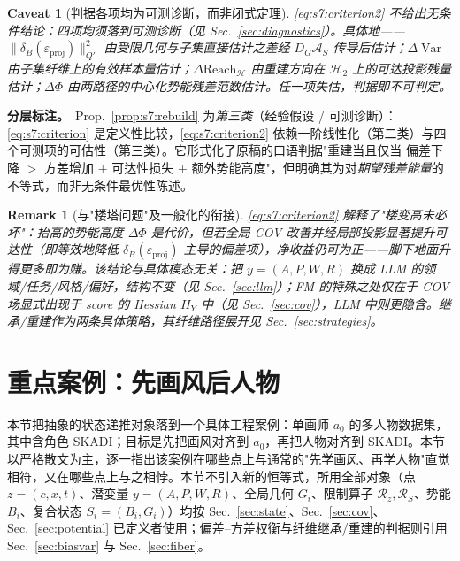 \documentclass[11pt,a4paper]{article}
\newtheorem{remark}[theorem]{Remark}
\newtheorem{caveat}[theorem]{Caveat}
\DeclareMathOperator{\Var}{Var}
\newcommand{\cH}{\mathcal{H}}   %
\newcommand{\Rstr}{\mathcal{R}}     %
\begin{document}
\begin{caveat}[判据各项均为可测诊断，而非闭式定理]\label{cav:s7:diag}
\eqref{eq:s7:criterion2} 不给出无条件结论：四项均须落到可测诊断（见 Sec.~\ref{sec:diagnostics}）。具体地——$\|\delta_B(\varepsilon_{\mathrm{proj}})\|_{Q'}^2$ 由受限几何与子集直接估计之差经 $D_G\mathcal{A}_S$ 传导后估计；$\Delta\!\Var$ 由子集纤维上的有效样本量估计；$\Delta\mathrm{Reach}_{\cH}$ 由重建方向在 $\cH_2$ 上的可达投影残量估计；$\Delta\!\Phi$ 由两路径的中心化势能残差范数估计。任一项失估，判据即不可判定。
\end{caveat}

\textbf{分层标注。}\ Prop.~\ref{prop:s7:rebuild} 为\emph{第三类}（经验假设 / 可测诊断）：\eqref{eq:s7:criterion} 是定义性比较，\eqref{eq:s7:criterion2} 依赖一阶线性化（第二类）与四个可测项的可估性（第三类）。它形式化了原稿的口语判据"重建当且仅当 偏差下降 $>$ 方差增加 $+$ 可达性损失 $+$ 额外势能高度"，但明确其为对\emph{期望残差能量}的不等式，而非无条件最优性陈述。

\begin{remark}[与"楼塔问题"及一般化的衔接]\label{rem:s7:tower}
\eqref{eq:s7:criterion2} 解释了"楼变高未必坏"：抬高的势能高度 $\Delta\!\Phi$ 是代价，但若全局 COV 改善并经局部投影显著提升可达性（即等效地降低 $\delta_B(\varepsilon_{\mathrm{proj}})$ 主导的偏差项），净收益仍可为正——脚下地面升得更多即为赚。该结论与具体模态无关：把 $y=(A,P,W,R)$ 换成 LLM 的领域/任务/风格/偏好，结构不变（见 Sec.~\ref{sec:llm}）；FM 的特殊之处仅在于 COV 场显式出现于 score 的 Hessian $H_Y$ 中（见 Sec.~\ref{sec:cov}），LLM 中则更隐含。继承/重建作为两条具体策略，其纤维路径展开见 Sec.~\ref{sec:strategies}。
\end{remark}

\section{重点案例：先画风后人物}\label{sec:case}

本节把抽象的状态递推对象落到一个具体工程案例：单画师 $a_0$ 的多人物数据集，其中含角色 SKADI；目标是先把画风对齐到 $a_0$，再把人物对齐到 SKADI。本节以严格散文为主，逐一指出该案例在哪些点上与通常的"先学画风、再学人物"直觉相符，又在哪些点上与之相悖。本节不引入新的恒等式，所用全部对象（点 $z=(c,x,t)$、潜变量 $y=(A,P,W,R)$、全局几何 $G_i$、限制算子 $\Rstr_z,\Rstr_S$、势能 $B_i$、复合状态 $S_i=(B_i,G_i)$）均按 Sec.~\ref{sec:state}、Sec.~\ref{sec:cov}、Sec.~\ref{sec:potential} 已定义者使用；偏差--方差权衡与纤维继承/重建的判据则引用 Sec.~\ref{sec:biasvar} 与 Sec.~\ref{sec:fiber}。
\end{document}
